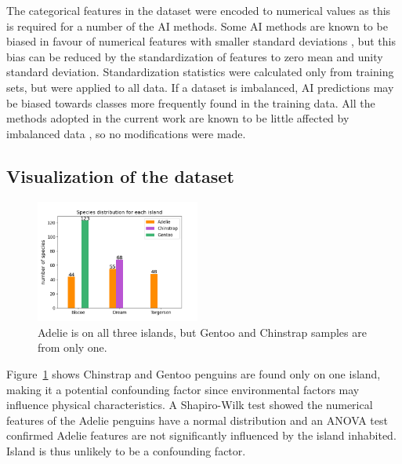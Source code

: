 \documentclass[a4paper, 11pt]{article}
\begin{document}
The categorical features in the dataset were encoded to numerical values as this is required for a number of the AI methods. 
Some AI methods are known to be biased in favour of numerical features 
with smaller standard deviations \cite{hastie2009elements}, but this bias can be reduced by the standardization 
of features to zero mean and unity standard deviation. Standardization statistics were calculated only from 
training sets, but were applied to all data. 
If a dataset is imbalanced, AI predictions may be biased towards classes more frequently found in the training data. 
All the methods adopted in the current work are known to be little affected by 
imbalanced data \cite{he2009learning}, so no modifications were made.

\subsection*{Visualization of the dataset}

\begin{figure} %
  \centering
  \vspace{-1\baselineskip} %
  \includegraphics[width=0.48\textwidth]{islands.png} %
  \vspace{-0.5\baselineskip} %
  \caption{\centering\linespread{0.8}\selectfont Adelie is on all three islands, but Gentoo and Chinstrap samples are from only one.}
  \vspace{-0.5\baselineskip} %
  \label{fig:islands}
\end{figure}
Figure~\ref{fig:islands} shows Chinstrap and Gentoo penguins are found only on one island, making it a potential confounding factor since 
environmental factors may influence physical characteristics. A Shapiro-Wilk test showed  
the numerical features of the Adelie penguins have a normal distribution and an ANOVA test confirmed Adelie features are not 
significantly influenced by the island inhabited. Island is thus unlikely to be a confounding factor.
\end{document}

